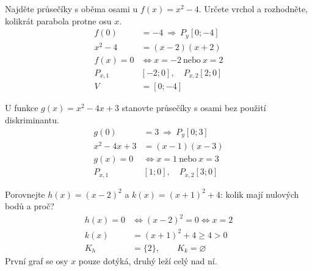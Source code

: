 \documentclass[11pt,a4paper]{article}
\begin{document}
\begin{prikladReseniBox}[title={Příklad 1}]
Najděte průsečíky s oběma osami u $f(x)=x^2-4$. Určete vrchol a rozhodněte, kolikrát parabola protne osu $x$.
\tcblower
\[
\begin{aligned}
f(0)&=-4\ \Rightarrow\ P_y[0;-4] \\
x^2-4&=(x-2)(x+2) \\
f(x)=0&\iff x=-2\ \text{nebo}\ x=2 \\
P_{x,1}&[-2;0],\quad P_{x,2}[2;0] \\
V&=[0;-4]
\end{aligned}
\]

\end{prikladReseniBox}
\begin{prikladReseniBox}[title={Příklad 2}]
U funkce $g(x)=x^2-4x+3$ stanovte průsečíky s osami bez použití diskriminantu.
\tcblower
\[
\begin{aligned}
g(0)&=3\ \Rightarrow\ P_y[0;3] \\
x^2-4x+3&=(x-1)(x-3) \\
g(x)=0&\iff x=1\ \text{nebo}\ x=3 \\
P_{x,1}&[1;0],\quad P_{x,2}[3;0]
\end{aligned}
\]

\end{prikladReseniBox}
\begin{prikladReseniBox}[title={Příklad 3}]
Porovnejte $h(x)=(x-2)^2$ a $k(x)=(x+1)^2+4$: kolik mají nulových bodů a proč?
\tcblower
\[
\begin{aligned}
h(x)=0&\iff (x-2)^2=0\iff x=2 \\
k(x)&=(x+1)^2+4\ge4>0 \\
K_h&=\{2\},\qquad K_k=\varnothing
\end{aligned}
\]
První graf se osy $x$ pouze dotýká, druhý leží celý nad ní.
\end{prikladReseniBox}
\end{document}
